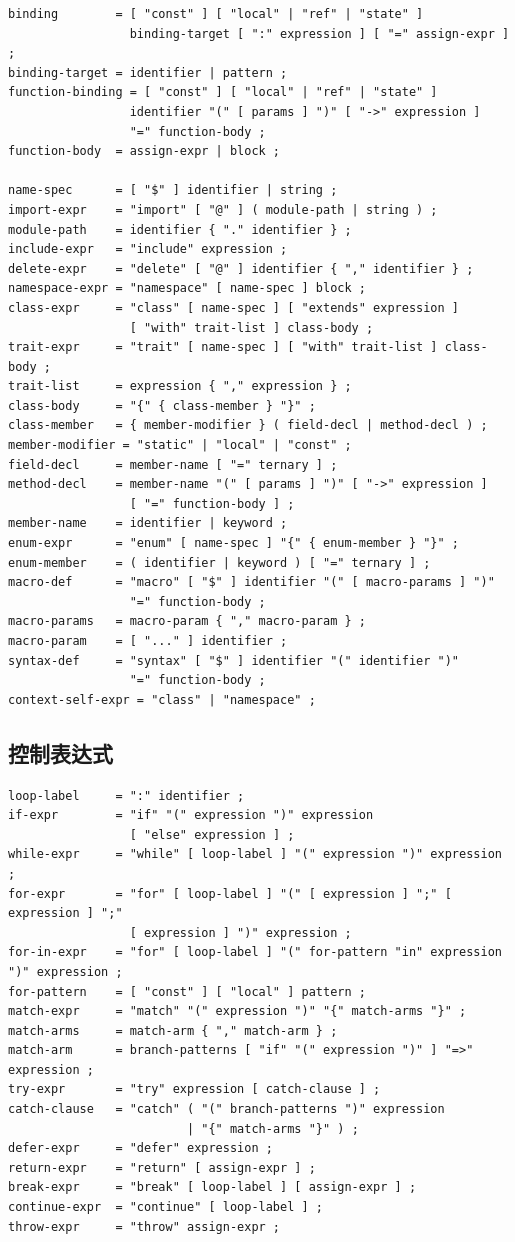 \documentclass[UTF8,12pt]{ctexart}
\begin{document}
\begin{lstlisting}
binding        = [ "const" ] [ "local" | "ref" | "state" ]
                 binding-target [ ":" expression ] [ "=" assign-expr ] ;
binding-target = identifier | pattern ;
function-binding = [ "const" ] [ "local" | "ref" | "state" ]
                 identifier "(" [ params ] ")" [ "->" expression ]
                 "=" function-body ;
function-body  = assign-expr | block ;

name-spec      = [ "$" ] identifier | string ;
import-expr    = "import" [ "@" ] ( module-path | string ) ;
module-path    = identifier { "." identifier } ;
include-expr   = "include" expression ;
delete-expr    = "delete" [ "@" ] identifier { "," identifier } ;
namespace-expr = "namespace" [ name-spec ] block ;
class-expr     = "class" [ name-spec ] [ "extends" expression ]
                 [ "with" trait-list ] class-body ;
trait-expr     = "trait" [ name-spec ] [ "with" trait-list ] class-body ;
trait-list     = expression { "," expression } ;
class-body     = "{" { class-member } "}" ;
class-member   = { member-modifier } ( field-decl | method-decl ) ;
member-modifier = "static" | "local" | "const" ;
field-decl     = member-name [ "=" ternary ] ;
method-decl    = member-name "(" [ params ] ")" [ "->" expression ]
                 [ "=" function-body ] ;
member-name    = identifier | keyword ;
enum-expr      = "enum" [ name-spec ] "{" { enum-member } "}" ;
enum-member    = ( identifier | keyword ) [ "=" ternary ] ;
macro-def      = "macro" [ "$" ] identifier "(" [ macro-params ] ")"
                 "=" function-body ;
macro-params   = macro-param { "," macro-param } ;
macro-param    = [ "..." ] identifier ;
syntax-def     = "syntax" [ "$" ] identifier "(" identifier ")"
                 "=" function-body ;
context-self-expr = "class" | "namespace" ;
\end{lstlisting}

\subsection{控制表达式}

\begin{lstlisting}
loop-label     = ":" identifier ;
if-expr        = "if" "(" expression ")" expression
                 [ "else" expression ] ;
while-expr     = "while" [ loop-label ] "(" expression ")" expression ;
for-expr       = "for" [ loop-label ] "(" [ expression ] ";" [ expression ] ";"
                 [ expression ] ")" expression ;
for-in-expr    = "for" [ loop-label ] "(" for-pattern "in" expression ")" expression ;
for-pattern    = [ "const" ] [ "local" ] pattern ;
match-expr     = "match" "(" expression ")" "{" match-arms "}" ;
match-arms     = match-arm { "," match-arm } ;
match-arm      = branch-patterns [ "if" "(" expression ")" ] "=>" expression ;
try-expr       = "try" expression [ catch-clause ] ;
catch-clause   = "catch" ( "(" branch-patterns ")" expression
                         | "{" match-arms "}" ) ;
defer-expr     = "defer" expression ;
return-expr    = "return" [ assign-expr ] ;
break-expr     = "break" [ loop-label ] [ assign-expr ] ;
continue-expr  = "continue" [ loop-label ] ;
throw-expr     = "throw" assign-expr ;
\end{lstlisting}
\end{document}
